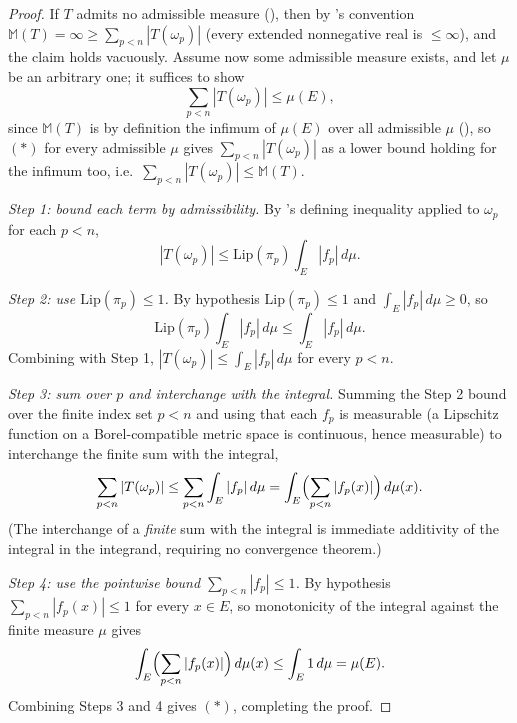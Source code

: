\begin{proof}
  If $T$ admits no admissible measure (), then by
  's convention $\mathbb{M}(T)=\infty\ge\sum_{p<n}|T(\omega_p)|$ (every
  extended nonnegative real is $\le\infty$), and the claim holds vacuously. Assume now some
  admissible measure exists, and let $\mu$ be an arbitrary one; it suffices to show
  \[
    \sum_{p<n}|T(\omega_p)| \le \mu(E)
    , \tag{$\ast$}
  \]
  since $\mathbb{M}(T)$ is by definition the infimum of $\mu(E)$ over all admissible $\mu$
  (), so $(\ast)$ for every admissible $\mu$ gives
  $\sum_{p<n}|T(\omega_p)|$ as a lower bound holding for the infimum too, i.e.\ $\sum_{p<n}
  |T(\omega_p)| \le \mathbb{M}(T)$.

  \emph{Step 1: bound each term by admissibility.} By 's defining inequality
  applied to $\omega_p$ for each $p<n$,
  \[
    |T(\omega_p)| \le \mathrm{Lip}(\pi_p) \int_E |f_p|\,d\mu
    .
  \]

  \emph{Step 2: use $\mathrm{Lip}(\pi_p)\le 1$.} By hypothesis $\mathrm{Lip}(\pi_p)\le 1$ and
  $\int_E|f_p|\,d\mu\ge 0$, so
  \[
    \mathrm{Lip}(\pi_p)\int_E|f_p|\,d\mu \le \int_E |f_p|\,d\mu
    .
  \]
  Combining with Step 1, $|T(\omega_p)|\le\int_E|f_p|\,d\mu$ for every $p<n$.

  \emph{Step 3: sum over $p$ and interchange with the integral.} Summing the Step 2 bound over the
  finite index set $p<n$ and using that each $f_p$ is measurable
  (a Lipschitz function on a Borel-compatible metric space is continuous, hence measurable) to
  interchange the finite sum with the integral,
  \[
    \sum_{p<n}|T(\omega_p)| \le \sum_{p<n}\int_E|f_p|\,d\mu = \int_E \Bigl(\sum_{p<n}|f_p(x)|\Bigr)\,d\mu(x)
    .
  \]
  (The interchange of a \emph{finite} sum with the integral is immediate additivity of the
  integral in the integrand, requiring no convergence theorem.)

  \emph{Step 4: use the pointwise bound $\sum_{p<n}|f_p|\le 1$.} By hypothesis $\sum_{p<n}|f_p(x)|
  \le 1$ for every $x\in E$, so monotonicity of the integral against the finite measure $\mu$ gives
  \[
    \int_E \Bigl(\sum_{p<n}|f_p(x)|\Bigr)\,d\mu(x) \le \int_E 1 \, d\mu = \mu(E)
    .
  \]
  Combining Steps 3 and 4 gives $(\ast)$, completing the proof.
\end{proof}
